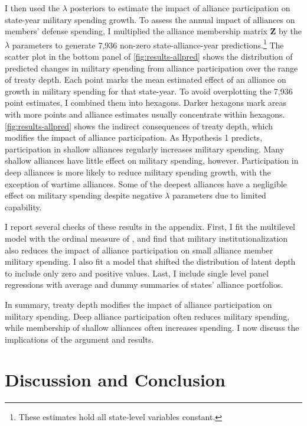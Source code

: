 \documentclass[12pt]{article}
\begin{document}
I then used the $\lambda$ posteriors to estimate the impact of alliance participation on state-year military spending growth. 
To assess the annual impact of alliances on members' defense spending, I multiplied the alliance membership matrix $\textbf{Z}$ by the $\lambda$ parameters to generate 7,936 non-zero state-alliance-year predictions.\footnote{These estimates hold all state-level variables constant.} 
The scatter plot in the bottom panel of \autoref{fig:results-allpred} shows the distribution of predicted changes in military spending from alliance participation over the range of treaty depth.
Each point marks the mean estimated effect of an alliance on growth in military spending for that state-year.
To avoid overplotting the 7,936 point estimates, I combined them into hexagons. 
Darker hexagons mark areas with more points and alliance estimates usually concentrate within hexagons. 
\autoref{fig:results-allpred} shows the indirect consequences of treaty depth, which modifies the impact of alliance participation. 
As Hypothesis 1 predicts, participation in shallow alliances regularly increases military spending. 
Many shallow alliances have little effect on military spending, however. 
Participation in deep alliances is more likely to reduce military spending growth, with the exception of wartime alliances. 
Some of the deepest alliances have a negligible effect on military spending despite negative $\lambda$ parameters due to limited capability. 


I report several checks of these results in the appendix.
First, I fit the multilevel model with the ordinal measure of \citep{LeedsAnac2005}, and find that military institutionalization also reduces the impact of alliance participation on small alliance member military spending. 
I also fit a model that shifted the distribution of latent depth to include only zero and positive values. 
Last, I include single level panel regressions with average and dummy summaries of states' alliance portfolios. 


In summary, treaty depth modifies the impact of alliance participation on military spending.  
Deep alliance participation often reduces military spending, while membership of shallow alliances often increases spending. 
I now discuss the implications of the argument and results. 



\section{Discussion and Conclusion}
\end{document}
